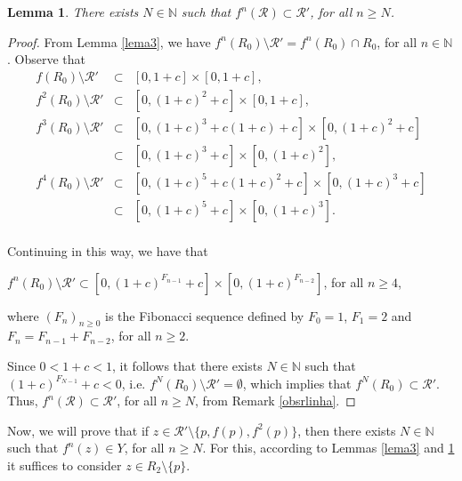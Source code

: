 \documentclass[11pt]{amsart}
\newtheorem{lemma}[theorem]{Lemma}
\theoremstyle{definition}
\begin{document}
\begin{lemma}
There exists $N\in\mathbb{N}$ such that $f^n(\mathcal{R})\subset \mathcal{R}'$, for all $n\geq N$. \label{lema33}
\end{lemma}
\begin{proof} From Lemma \ref{lema3}, we have $f^n(R_0)\setminus \mathcal{R}'=f^n(R_0)\cap R_0$, for all $n\in\mathbb{N}$. Observe that
	$$
	\begin{array}{rcl}
f(R_0)\setminus \mathcal{R}' & \subset & [0,1+c]\times[0,1+c], \\
f^2(R_0)\setminus \mathcal{R}' & \subset & [0,(1+c)^2+c]\times[0,1+c], \\
f^3(R_0)\setminus \mathcal{R}' & \subset & [0,(1+c)^3+c(1+c)+c]\times[0,(1+c)^2+c] \\
                     & \subset & [0,(1+c)^3+c]\times[0,(1+c)^2], \\
f^4(R_0)\setminus \mathcal{R}' & \subset & [0,(1+c)^5+c(1+c)^2+c]\times[0,(1+c)^3+c] \\
                     & \subset & [0,(1+c)^5+c]\times[0,(1+c)^3]. \\
	\end{array}
	$$
	
	Continuing in this way, we have that
	
	\begin{center}
		$f^n(R_0)\setminus \mathcal{R}' \subset [0,(1+c)^{F_{n-1}}+c]\times[0,(1+c)^{F_{n-2}}]$, for all $n\geq 4$,
	\end{center}
	where $(F_n)_{n\geq 0}$ is the Fibonacci sequence defined by $F_0=1$, $F_1=2$ and $F_n=F_{n-1}+F_{n-2}$, for all $n\geq 2$.
	
	
	Since $0<1+c<1$, it follows that there exists $N\in \mathbb{N}$ such that $(1+c)^{F_{N-1}}+c<0$, i.e. $f^N(R_0)\setminus \mathcal{R}'=\emptyset$, which implies that $f^N(R_0)\subset \mathcal{R}'$. Thus, $f^n(\mathcal{R})\subset\mathcal{R}'$, for all $n\geq N$, from Remark \ref{obsrlinha}.
\end{proof}

Now, we will prove that if $z\in \mathcal{R}'\setminus\{p,f(p),f^2(p)\}$, then there exists $N\in\mathbb{N}$ such that $f^n(z)\in Y$, for all $n\geq N$. For this, according to Lemmas \ref{lema3} and \ref{lema33} it suffices to consider $z\in R_2\setminus\{p\}$.
\end{document}
